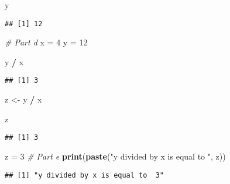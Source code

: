 \documentclass[
]{article}
\newenvironment{Shaded}{\begin{snugshade}}{\end{snugshade}}
\newcommand{\CommentTok}[1]{\textcolor[rgb]{0.56,0.35,0.01}{\textit{#1}}}
\newcommand{\DecValTok}[1]{\textcolor[rgb]{0.00,0.00,0.81}{#1}}
\newcommand{\FunctionTok}[1]{\textcolor[rgb]{0.13,0.29,0.53}{\textbf{#1}}}
\newcommand{\NormalTok}[1]{#1}
\newcommand{\OtherTok}[1]{\textcolor[rgb]{0.56,0.35,0.01}{#1}}
\newcommand{\SpecialCharTok}[1]{\textcolor[rgb]{0.81,0.36,0.00}{\textbf{#1}}}
\newcommand{\StringTok}[1]{\textcolor[rgb]{0.31,0.60,0.02}{#1}}
\begin{document}
\begin{Shaded}
\begin{Highlighting}[]
\NormalTok{y}
\end{Highlighting}
\end{Shaded}

\begin{verbatim}
## [1] 12
\end{verbatim}

\begin{Shaded}
\begin{Highlighting}[]
\CommentTok{\# Part d}
\NormalTok{x }\OtherTok{=} \DecValTok{4}
\NormalTok{y }\OtherTok{=} \DecValTok{12}

\NormalTok{y }\SpecialCharTok{/}\NormalTok{ x}
\end{Highlighting}
\end{Shaded}

\begin{verbatim}
## [1] 3
\end{verbatim}

\begin{Shaded}
\begin{Highlighting}[]
\NormalTok{z }\OtherTok{\textless{}{-}}\NormalTok{ y }\SpecialCharTok{/}\NormalTok{ x}

\NormalTok{z}
\end{Highlighting}
\end{Shaded}

\begin{verbatim}
## [1] 3
\end{verbatim}

\begin{Shaded}
\begin{Highlighting}[]
\NormalTok{z }\OtherTok{=} \DecValTok{3}
\CommentTok{\# Part e}
\FunctionTok{print}\NormalTok{(}\FunctionTok{paste}\NormalTok{(}\StringTok{"y divided by x is equal to "}\NormalTok{, z))}
\end{Highlighting}
\end{Shaded}

\begin{verbatim}
## [1] "y divided by x is equal to  3"
\end{verbatim}
\end{document}

